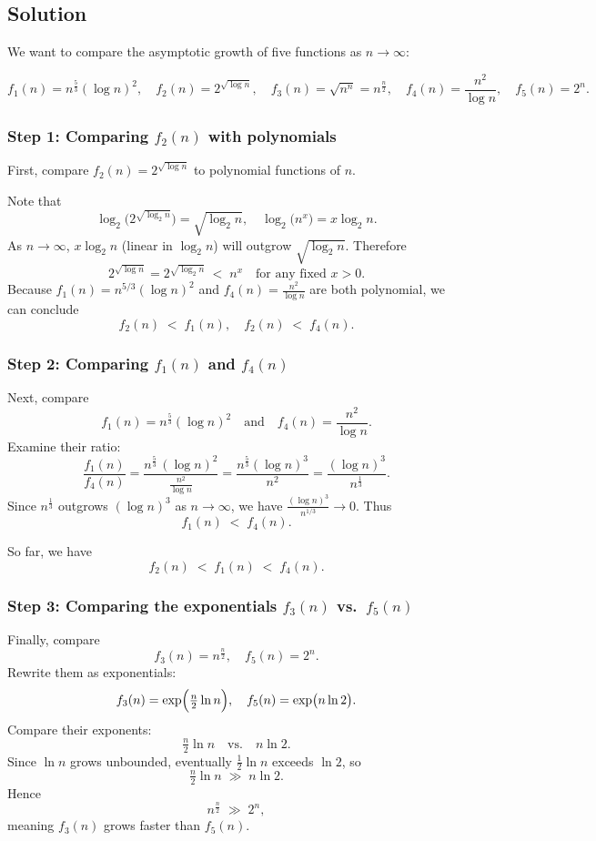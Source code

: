 \documentclass[12pt]{article}
\begin{document}
\subsection*{Solution}

We want to compare the asymptotic growth of five functions as \(n \to \infty\):

\[
f_1(n) = n^{\tfrac{5}{3}} (\log n)^2, 
\quad
f_2(n) = 2^{\sqrt{\log n}}, 
\quad
f_3(n) = \sqrt{n^n} = n^{\tfrac{n}{2}}, 
\quad
f_4(n) = \frac{n^2}{\log n},
\quad
f_5(n) = 2^n.
\]

\subsubsection*{Step 1: Comparing \(f_2(n)\) with polynomials}
First, compare \(f_2(n) = 2^{\sqrt{\log n}}\) to polynomial functions of \(n\). 

Note that 
\[
\log_2 \bigl( 2^{\sqrt{\log_2 n}} \bigr) 
= \sqrt{\log_2 n},
\quad
\log_2 \bigl(n^x \bigr)
= x \log_2 n.
\]
As \(n \to \infty\), \(x \log_2 n\) (linear in \(\log_2 n\)) will outgrow \(\sqrt{\log_2 n}\). Therefore
\[
2^{\sqrt{\log n}} = 2^{\sqrt{\log_2 n}} 
\; < \; 
n^x
\quad
\text{for any fixed } x > 0.
\]
Because \(f_1(n) = n^{5/3} (\log n)^2\) and \(f_4(n) = \tfrac{n^2}{\log n}\) are both polynomial, we can conclude
\[
f_2(n) \; < \; f_1(n), 
\quad
f_2(n) \; < \; f_4(n).
\]

\subsubsection*{Step 2: Comparing \(f_1(n)\) and \(f_4(n)\)}
Next, compare
\[
f_1(n) = n^{\tfrac{5}{3}} (\log n)^2
\quad\text{and}\quad
f_4(n) = \frac{n^2}{\log n}.
\]
Examine their ratio:
\[
\frac{f_1(n)}{f_4(n)}
= \frac{n^{\tfrac{5}{3}} \,(\log n)^2}{\tfrac{n^2}{\log n}}
= \frac{n^{\tfrac{5}{3}} (\log n)^3}{n^2}
= \frac{(\log n)^3}{n^{\tfrac{1}{3}}}.
\]
Since \(n^{\tfrac{1}{3}}\) outgrows \((\log n)^3\) as \(n\to\infty\), we have 
\(\tfrac{(\log n)^3}{n^{1/3}} \to 0\). Thus
\[
f_1(n) \; < \; f_4(n).
\]

So far, we have
\[
f_2(n) \; < \; f_1(n) \; < \; f_4(n).
\]

\subsubsection*{Step 3: Comparing the exponentials \(f_3(n)\) vs.\ \(f_5(n)\)}
Finally, compare
\[
f_3(n) = n^{\tfrac{n}{2}},
\quad 
f_5(n) = 2^n.
\]
Rewrite them as exponentials:
\[
f_3(n) = \exp\Bigl(\tfrac{n}{2} \ln n\Bigr),
\quad
f_5(n) = \exp\bigl(n \ln 2\bigr).
\]
Compare their exponents:
\[
\tfrac{n}{2} \ln n
\quad \text{vs.} \quad
n \ln 2.
\]
Since \(\ln n\) grows unbounded, eventually \(\tfrac{1}{2}\ln n\) exceeds \(\ln 2\), so
\[
\tfrac{n}{2} \ln n 
\;\gg\;
n \ln 2.
\]
Hence 
\[
n^{\tfrac{n}{2}} 
\;\gg\;
2^n,
\]
meaning \(f_3(n)\) grows faster than \(f_5(n)\).
\end{document}
